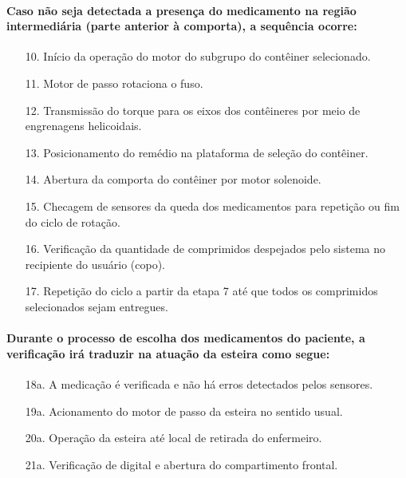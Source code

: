 \paragraph*{Caso não seja detectada a presença do medicamento na região intermediária (parte  anterior à comporta), a sequência ocorre:}

\begin{enumerate}
    \item[10.] Início da operação do motor do subgrupo do contêiner selecionado.
    \item[11.] Motor de passo rotaciona o fuso.
    \item[12.] Transmissão do torque para os eixos dos contêineres por meio de engrenagens helicoidais.
    \item[13.] Posicionamento do remédio na plataforma de seleção do contêiner.
    \item[14.] Abertura da comporta do contêiner por motor solenoide.
    \item[15.] Checagem de sensores da queda dos medicamentos para repetição ou fim do ciclo de rotação.
    \item[16.] Verificação da quantidade de comprimidos despejados pelo sistema no recipiente do usuário (copo).
    \item[17.] Repetição do ciclo a partir da etapa 7 até que todos os comprimidos selecionados sejam entregues.
\end{enumerate}


\paragraph*{Durante o processo de escolha dos medicamentos do paciente, a verificação irá traduzir na atuação da esteira como segue:}

\begin{enumerate}
    \item[18a.] A medicação é verificada e não há erros detectados pelos sensores.
    \item[19a.] Acionamento do motor de passo da esteira no sentido usual.
    \item[20a.] Operação da esteira até local de retirada do enfermeiro. 
    \item[21a.] Verificação de digital e abertura do compartimento frontal.
\end{enumerate}
   
